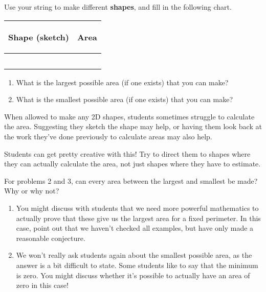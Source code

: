 \documentclass{ximera}
\begin{document}
\newpage
\begin{problem} Use your string to make different {\bf shapes}, and fill in the following chart.
\vskip 0.1in
\begin{tabular}{|p{2.2in}|p{2.2in}|}
\hline
\begin{center} Shape (sketch) \end{center} & \begin{center} Area \end{center}  \\ \hline
 & \\ [10ex] \hline
 & \\ [10 ex] \hline
 & \\ [10 ex] \hline
 & \\ [10 ex] \hline
 & \\ [10 ex] \hline
\end{tabular}

\begin{enumerate}

\item What is the largest possible area (if one exists) that you can make?
\item What is the smallest possible area (if one exists) that you can make?
\end{enumerate}

\begin{instructorNotes}
  When allowed to make any 2D shapes, students sometimes struggle to calculate the area.  Suggesting they sketch the shape may help, or having them look back at the work they've done previously to calculate areas may also help.  

Students can get pretty creative with this!  Try to direct them to shapes where they can actually calculate the area, not just shapes where they have to estimate.
\end{instructorNotes}
\end{problem}

\begin{problem} For problems 2 and 3, can every area between the largest and smallest be made?  Why or why not?


\begin{instructorNotes}
\begin{enumerate}
	\item You might discuss with students that we need more powerful mathematics to actually prove that these give us the largest area for a fixed perimeter.  In this case, point out that we haven't checked all examples, but have only made a reasonable conjecture.
	\item We won't really ask students again about the smallest possible area, as the answer is a bit difficult to state.  Some students like to say that the minimum is zero.  You might discuss whether it's possible to actually have an area of zero in this case!
\end{enumerate}

\end{instructorNotes}
\end{problem}
\end{document}

